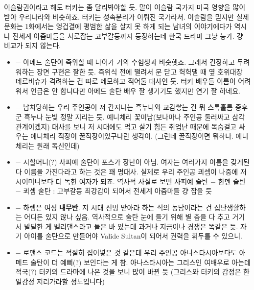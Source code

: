 이슬람권이라고 해도 터키는 좀 달리봐야할 듯. 말이 이슬람 국가지 미국 영향을 많이 받아 우리나라와 비슷하죠.
터키는 성속분리가 이뤄진 국가라서. 이슬람을 믿지만 실제 문화는
1화에서는 엉겁결에 평범한 삶을 살지 못 하게 되는 남녀의 이야기에다가
역시나 전세계 아줌마들을 사로잡는 고부갈등까지 등장하는데
한국 드라마 그냥 능가. 걍 비교가 되지 않는다.
\vspace{5mm}
\begin{itemize}

    \item $-$ 아메드 술탄이 즉위할 때 나이가 거의 수험생과 비슷햇죠. 그래서 긴장하고 두려워하는 장면 구현은 잘한 듯.
    즉위식 전에 떨려서 문 닫고 헉헉댈 때 옆 호위대장 데르비슈가 격려하는 건 따로 메모하고 적어둘 대사인 듯.
    터키 배우들 이름이 어려워서 언급은 안 합니다만 아메드 술탄 배우 잘 생기기도 했지만 연기 잘 하네요.
    \vspace{5mm}

    \item $-$ 납치당하는 우리 주인공이 저 간지나는 흑누나와 교감쌓는 건 뭐 스톡홀름 증후군
    흑누나 눈빛 정말 지리는 듯.
    예니체리 꽃미남(보나마나 주인공 둘러싸고 삼각관계이겠지) 대사를 보니
    저 시대에도 먹고 살기 힘든 취업난 때문에 목숨걸고 싸우는 예니체리 직장이 꿀직장이었구나란 생각이.
    (그런데 꿀직장이면 뭐하나. 예니체리는 원래 독신인데)
    \vspace{5mm}

    \item $-$ 시할머니(?) 사피예 술탄이 포스가 장난이 아님.
    여자는 여러가지 이름을 갖게된다 이름을 가진다라고 하는 것은 꽤 명대사.
    실제로 우리 주인공 쾨셈이 나중에 저 시어머니보다 더 독한 여자가 되죠.
    역사적 사실로 보면 사피예 술탄 $-$ 한덴 술탄 $-$ 쾨셈 술탄 : 고부갈등 최강갑이 되어서 전세계 아줌마들 걍 잡을 듯
    \vspace{5mm}

    \item $-$  하렘은 여성 \textbf{내무반}.
    저 시대 신병 받아라 하는 식의 농담이라는 건 집단생활하는 어디든 있지 않나 싶음.
    역사적으로 술탄 눈에 들기 위해 별 춤을 다 추고 거기서 발달한 게 벨리댄스라고 들은 바 있는데
    과거나 지금이나 경쟁은 똑같은 듯. 자기 아이를 술탄으로 만들어야 Valide Sultan이 되어서 권력을 휘두를 수 있으니.
    \vspace{5mm}

    \item $-$ 로맨스 코드는 적절히 집어넣은 것 같은데
    우리 주인공 아니스타시아보다도 아메드 술탄이 더 예뻐(?) 보인다는 게 참.
    아나스타시아는 그리스인 여배우로 아는데 적국(?) 터키의 드라마에 나온 것을 보니 많이 바뀐 듯
    (그리스와 터키의 감정은 한일감정 저리가라할 정도입니다)
    \vspace{5mm}


\end{itemize}
